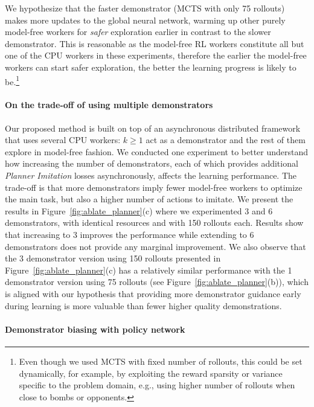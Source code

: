 \documentclass[letterpaper]{article} %
\begin{document}
We hypothesize that the faster demonstrator (MCTS with only 75 rollouts) makes more updates to the global neural network, warming up other purely model-free workers for \emph{safer} exploration earlier in contrast to the slower demonstrator. This is reasonable as the model-free RL workers constitute all but one of the CPU workers in these experiments, therefore the earlier the model-free workers can start safer exploration, the better the learning progress is likely to be.\footnote{Even though we used MCTS with fixed number of rollouts, this could be set dynamically, for example, by exploiting the reward sparsity or variance specific to the problem domain, e.g., using higher number of rollouts when close to bombs or opponents.}

\paragraph{On the trade-off of using multiple demonstrators}

Our proposed method is built on top of an asynchronous distributed framework that uses several CPU workers: $k\ge 1$ act as a demonstrator and the rest of them explore in model-free fashion. We conducted one  experiment to better understand how increasing the number of demonstrators, each of which provides additional \emph{Planner Imitation} losses asynchronously, affects the learning performance. The trade-off is that more demonstrators imply fewer model-free workers to optimize the main task, but also a higher number of actions to imitate. We present the results in Figure~\ref{fig:ablate_planner}(c) where we experimented 3 and 6 demonstrators, with identical resources and with 150 rollouts each. Results show that increasing to 3 improves the performance while extending to 6 demonstrators does not provide any marginal improvement. We also observe that the 3 demonstrator version using 150 rollouts presented in Figure~\ref{fig:ablate_planner}(c) has a relatively similar performance with the 1 demonstrator version using 75 rollouts (see Figure~\ref{fig:ablate_planner}(b)), which is aligned with our hypothesis that providing more demonstrator guidance early during learning is more valuable than fewer higher quality demonstrations.
\paragraph{Demonstrator biasing with policy network}
\end{document}
